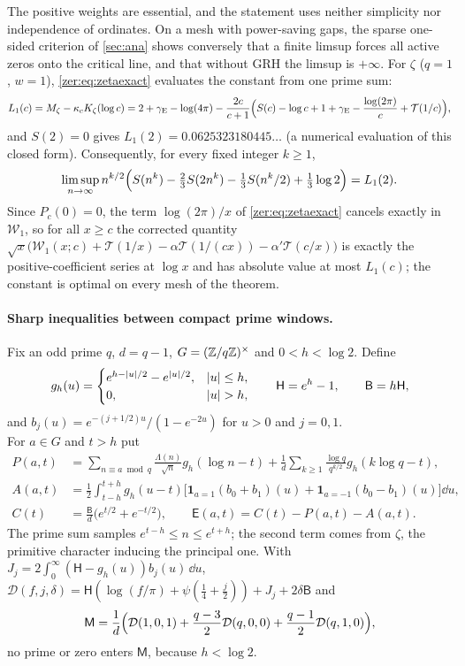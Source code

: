 The positive weights are essential, and the statement uses neither simplicity nor
independence of ordinates. On a mesh with power-saving gaps, the sparse one-sided criterion of
\cref{sec:ana} shows conversely that a finite limsup forces all active zeros onto the critical
line, and that without GRH the limsup is $+\infty$. For $\zeta$ ($q=1$, $w=1$), \eqref{zer:eq:zetaexact}
evaluates the constant from one prime sum:
\[
 L_1(c)=M_\zeta-\kappa_cK_\zeta(\log c)
 =2+\gamma_{\mathrm{E}}-\log(4\pi)-\frac{2c}{c+1}\Bigl(S(c)-\log c+1+\gamma_{\mathrm{E}}-\frac{\log(2\pi)}c+\mathcal T(1/c)\Bigr),
\]
and $S(2)=0$ gives $L_1(2)=0.0625323180445\ldots$ (a numerical evaluation of this closed form).
Consequently, for every fixed integer $k\ge1$,
\[
 \limsup_{n\to\infty}n^{k/2}\Bigl(S(n^k)-\tfrac23S(2n^k)-\tfrac13S(n^k/2)+\tfrac13\log2\Bigr)=L_1(2).
\]
Since $P_c(0)=0$, the term $\log(2\pi)/x$ of \eqref{zer:eq:zetaexact} cancels exactly in
$\mathcal W_1$, so for all $x\ge c$ the corrected quantity
$\sqrt x\bigl(\mathcal W_1(x;c)+\mathcal T(1/x)-\alpha\mathcal T(1/(cx))-\alpha'\mathcal T(c/x)\bigr)$ is exactly the
positive-coefficient series at $\log x$ and has absolute value at most $L_1(c)$; the constant is
optimal on every mesh of the theorem.

\paragraph{Sharp inequalities between compact prime windows.}
Fix an odd prime $q$, $d=q-1$, $G=(\mathbb{Z}/q\mathbb{Z})^\times$ and $0<h<\log2$. Define
\[
 g_h(u)=\begin{cases}e^{h-\lvert u\rvert/2}-e^{\lvert u\rvert/2},&\lvert u\rvert\le h,\\0,&\lvert u\rvert>h,\end{cases}\qquad
 \mathsf H=e^h-1,\qquad\mathsf B=h\mathsf H,
\]
and $b_j(u)=e^{-(j+1/2)u}/(1-e^{-2u})$ for $u>0$ and $j=0,1$.
\[
\]
For $a\in G$ and $t>h$ put
\begin{align*}
 P(a,t)&=\sum_{n\equiv a\bmod q}\frac{\Lambda(n)}{\sqrt n}g_h(\log n-t)+\frac1d\sum_{k\ge1}\frac{\log q}{q^{k/2}}g_h(k\log q-t),\\
 A(a,t)&=\frac12\int_{t-h}^{t+h}g_h(u-t)\bigl[\mathbf 1_{a=1}(b_0+b_1)(u)+\mathbf 1_{a=-1}(b_0-b_1)(u)\bigr]\dd u,\\
 C(t)&=\frac{\mathsf B}d\bigl(e^{t/2}+e^{-t/2}\bigr),\qquad \mathsf E(a,t)=C(t)-P(a,t)-A(a,t).
\end{align*}
The prime sum samples $e^{t-h}\le n\le e^{t+h}$; the second term comes from $\zeta$, the
primitive character inducing the principal one. With
$J_j=2\int_0^\infty(\mathsf H-g_h(u))b_j(u)\,\dd u$,
$\mathcal D(f,j,\delta)=\mathsf H(\log(f/\pi)+\psi(\tfrac14+\tfrac j2))+J_j+2\delta\mathsf B$ and
\[
 \mathsf M=\frac1d\Bigl(\mathcal D(1,0,1)+\frac{q-3}2\mathcal D(q,0,0)+\frac{q-1}2\mathcal D(q,1,0)\Bigr),
\]
no prime or zero enters $\mathsf M$, because $h<\log2$.


